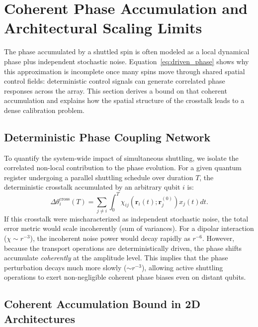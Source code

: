 \documentclass[a4paper,twocolumn,11pt]{quantumarticle}
\begin{document}
\section{Coherent Phase Accumulation and Architectural Scaling Limits}
\label{sec:phase_corr}

The phase accumulated by a shuttled spin is often modeled as a local dynamical phase plus independent stochastic noise. Equation~\eqref{eq:driven_phase} shows why this approximation is incomplete once many spins move through shared spatial control fields: deterministic control signals can generate correlated phase responses across the array. This section derives a bound on that coherent accumulation and explains how the spatial structure of the crosstalk leads to a dense calibration problem.

\subsection{Deterministic Phase Coupling Network}

To quantify the system-wide impact of simultaneous shuttling, we isolate the correlated non-local contribution to the phase evolution. For a given quantum register undergoing a parallel shuttling schedule over duration $T$, the deterministic crosstalk accumulated by an arbitrary qubit $i$ is:
\begin{equation}
    \Delta\theta_i^{\text{cross}}(T) = \sum_{j \neq i} \int_0^T \chi_{ij}(\mathbf{r}_i(t); \mathbf{r}_j^{(0)}) x_j(t) dt.
    \label{eq:deterministic_cross}
\end{equation}
If this crosstalk were mischaracterized as independent stochastic noise, the total error metric would scale incoherently (sum of variances). For a dipolar interaction ($\chi \sim r^{-3}$), the incoherent noise power would decay rapidly as $r^{-6}$. However, because the transport operations are deterministically driven, the phase shifts accumulate \textit{coherently} at the amplitude level. This implies that the phase perturbation decays much more slowly ($\sim r^{-3}$), allowing active shuttling operations to exert non-negligible coherent phase biases even on distant qubits.

\subsection{Coherent Accumulation Bound in 2D Architectures}
\end{document}

